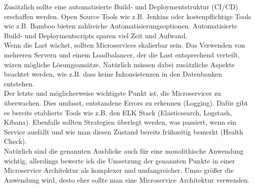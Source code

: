 Zusätzlich sollte eine automatisierte Build- und Deploymentstruktur (CI/CD) erschaffen werden. Open Source Tools wie z.B. Jenkins oder kostenpflichtige Tools wie z.B. Bamboo bieten zahlreiche Automatisierungsoptionen. Automatisierte Build- und Deploymentscripts sparen viel Zeit und Aufwand. \\

Wenn die Last wächst, sollten Microservices skalierbar sein. Das Verwenden von mehreren Servern und einem Loadbalancer, der die Last entsprechend verteilt, wären mögliche Lösungsansätze. Natürlich müssen dabei zusätzliche Aspekte beachtet werden, wie z.B. dass keine Inkonsistenzen in den Datenbanken entstehen. \\

Der letzte und möglicherweise wichtigste Punkt ist, die Microservices zu überwachen. Dies umfasst, entstandene Errors zu erkennen (Logging). Dafür gibt es bereits etablierte Tools wie z.B. den ELK Stack (Elasticsearch, Logstash, Kibana). Ebenfalls sollten Strategien überlegt werden, was passiert, wenn ein Service ausfällt und wie man diesen Zustand bereits frühzeitig bemerkt (Health Check). \\
 
Natürlich sind die genannten Ausblicke auch für eine monolithische Anwendung wichtig, allerdings bewerte ich die Umsetzung der genannten Punkte in einer Microservice Architektur als komplexer und umfangreicher. Umso größer die Anwendung wird, desto eher sollte man eine Microservice Architektur verwenden.
\pagebreak